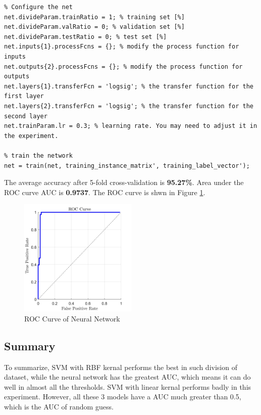 \documentclass[a4paper,12pt]{article} %
\begin{document}
\begin{footnotesize}
\begin{verbatim}
% Configure the net
net.divideParam.trainRatio = 1; % training set [%]
net.divideParam.valRatio = 0; % validation set [%]
net.divideParam.testRatio = 0; % test set [%]
net.inputs{1}.processFcns = {}; % modify the process function for inputs
net.outputs{2}.processFcns = {}; % modify the process function for outputs
net.layers{1}.transferFcn = 'logsig'; % the transfer function for the first layer
net.layers{2}.transferFcn = 'logsig'; % the transfer function for the second layer
net.trainParam.lr = 0.3; % learning rate. You may need to adjust it in the experiment.

% train the network
net = train(net, training_instance_matrix', training_label_vector');
\end{verbatim}
\end{footnotesize}

\hspace{0.7cm}
The average accuracy after 5-fold cross-validation is \textbf{95.27\%}. Area under the ROC curve AUC is \textbf{0.9737}. The ROC curve is shwn in Figure \ref{fig:roc4}.

\begin{figure}[!htbp]
	\centering
	\includegraphics[width=0.5\textwidth]{NNROC.jpg}
	\caption{ROC Curve of Neural Network}
	\label{fig:roc4}
\end{figure}

\subsection{Summary}
\hspace{0.7cm}
To summarize, SVM with RBF kernal performs the best in such division of dataset, while the neural network has the greatest AUC, which means it can do well in almost all the thresholds. SVM with linear kernal performs badly in this experiment. However, all these 3 models have a AUC much greater than 0.5, which is the AUC of random guess.
\end{document}
